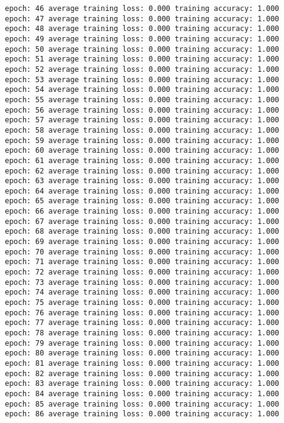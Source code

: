 \documentclass[10pt]{article}
\begin{document}
\begin{Verbatim}[commandchars=\\\{\}]
epoch: 46 average training loss: 0.000 training accuracy: 1.000
epoch: 47 average training loss: 0.000 training accuracy: 1.000
epoch: 48 average training loss: 0.000 training accuracy: 1.000
epoch: 49 average training loss: 0.000 training accuracy: 1.000
epoch: 50 average training loss: 0.000 training accuracy: 1.000
epoch: 51 average training loss: 0.000 training accuracy: 1.000
epoch: 52 average training loss: 0.000 training accuracy: 1.000
epoch: 53 average training loss: 0.000 training accuracy: 1.000
epoch: 54 average training loss: 0.000 training accuracy: 1.000
epoch: 55 average training loss: 0.000 training accuracy: 1.000
epoch: 56 average training loss: 0.000 training accuracy: 1.000
epoch: 57 average training loss: 0.000 training accuracy: 1.000
epoch: 58 average training loss: 0.000 training accuracy: 1.000
epoch: 59 average training loss: 0.000 training accuracy: 1.000
epoch: 60 average training loss: 0.000 training accuracy: 1.000
epoch: 61 average training loss: 0.000 training accuracy: 1.000
epoch: 62 average training loss: 0.000 training accuracy: 1.000
epoch: 63 average training loss: 0.000 training accuracy: 1.000
epoch: 64 average training loss: 0.000 training accuracy: 1.000
epoch: 65 average training loss: 0.000 training accuracy: 1.000
epoch: 66 average training loss: 0.000 training accuracy: 1.000
epoch: 67 average training loss: 0.000 training accuracy: 1.000
epoch: 68 average training loss: 0.000 training accuracy: 1.000
epoch: 69 average training loss: 0.000 training accuracy: 1.000
epoch: 70 average training loss: 0.000 training accuracy: 1.000
epoch: 71 average training loss: 0.000 training accuracy: 1.000
epoch: 72 average training loss: 0.000 training accuracy: 1.000
epoch: 73 average training loss: 0.000 training accuracy: 1.000
epoch: 74 average training loss: 0.000 training accuracy: 1.000
epoch: 75 average training loss: 0.000 training accuracy: 1.000
epoch: 76 average training loss: 0.000 training accuracy: 1.000
epoch: 77 average training loss: 0.000 training accuracy: 1.000
epoch: 78 average training loss: 0.000 training accuracy: 1.000
epoch: 79 average training loss: 0.000 training accuracy: 1.000
epoch: 80 average training loss: 0.000 training accuracy: 1.000
epoch: 81 average training loss: 0.000 training accuracy: 1.000
epoch: 82 average training loss: 0.000 training accuracy: 1.000
epoch: 83 average training loss: 0.000 training accuracy: 1.000
epoch: 84 average training loss: 0.000 training accuracy: 1.000
epoch: 85 average training loss: 0.000 training accuracy: 1.000
epoch: 86 average training loss: 0.000 training accuracy: 1.000

\end{Verbatim}
\end{document}
